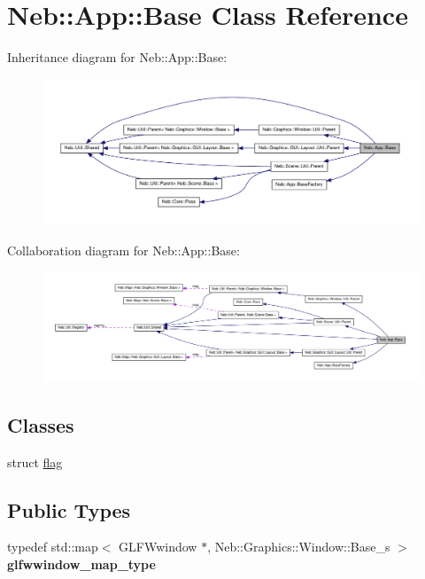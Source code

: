 \hypertarget{classNeb_1_1App_1_1Base}{\section{\-Neb\-:\-:\-App\-:\-:\-Base \-Class \-Reference}
\label{classNeb_1_1App_1_1Base}
}


\-Inheritance diagram for \-Neb\-:\-:\-App\-:\-:\-Base\-:\nopagebreak
\begin{figure}[H]
\begin{center}
\leavevmode
\includegraphics[width=350pt]{classNeb_1_1App_1_1Base__inherit__graph}
\end{center}
\end{figure}


\-Collaboration diagram for \-Neb\-:\-:\-App\-:\-:\-Base\-:\nopagebreak
\begin{figure}[H]
\begin{center}
\leavevmode
\includegraphics[width=350pt]{classNeb_1_1App_1_1Base__coll__graph}
\end{center}
\end{figure}
\subsection*{\-Classes}
\begin{DoxyCompactItemize}
\item 
struct \hyperlink{structNeb_1_1App_1_1Base_1_1flag}{flag}
\end{DoxyCompactItemize}
\subsection*{\-Public \-Types}
\begin{DoxyCompactItemize}
\item 
\hypertarget{classNeb_1_1App_1_1Base_a893ad32232e1d5607f16c0a8712e2742}{typedef std\-::map$<$ \-G\-L\-F\-Wwindow \*
$\ast$, \-Neb\-::\-Graphics\-::\-Window\-::\-Base\-\_\-s $>$ {\bfseries glfwwindow\-\_\-map\-\_\-type}}\label{classNeb_1_1App_1_1Base_a893ad32232e1d5607f16c0a8712e2742}

\end{DoxyCompactItemize}
